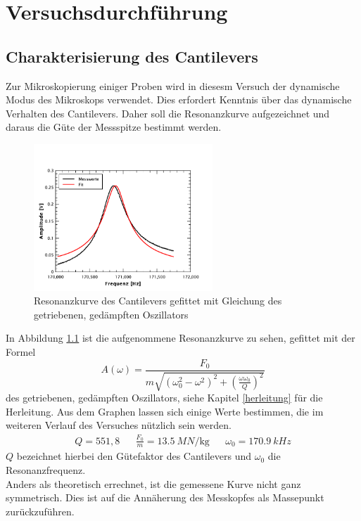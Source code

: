 \chapter{Versuchsdurchführung}

    \section{Charakterisierung des Cantilevers}

Zur Mikroskopierung einiger Proben wird in diesesm Versuch der dynamische Modus des
Mikroskops verwendet. Dies erfordert Kenntnis über das dynamische Verhalten des 
Cantilevers. Daher soll die Resonanzkurve aufgezeichnet und daraus die Güte der
Messspitze bestimmt werden. \par
\begin{figure}[hb]
    \centering
    \includegraphics[width=0.6\textwidth]{Mess/freqsweep_2.pdf}
    \caption{Resonanzkurve des Cantilevers gefittet mit Gleichung des getriebenen,
             gedämpften Oszillators}
    \label{freqsweep}
\end{figure}
In Abbildung \ref{freqsweep} ist die aufgenommene Resonanzkurve zu sehen, gefittet
mit der Formel
\[
    A(\omega) = \frac{F_0}{m \sqrt{(\omega_0^2 - \omega^2)^2 + \left( 
    \frac{\omega\omega_0}{Q} \right)^2} }
\]
des getriebenen, gedämpften Oszillators, siehe Kapitel \ref{herleitung} für die 
Herleitung. Aus dem Graphen lassen sich einige Werte
bestimmen, die im weiteren Verlauf des Versuches nützlich sein werden.
\begin{align*}
    Q=551,8 & & \frac{F_0}{m} = \SI{13,5}{MN\per\kg} & & \omega_0 =
    \SI{170,9}{kHz}
\end{align*}
$Q$ bezeichnet hierbei den Gütefaktor des Cantilevers und $\omega_0$ die 
Resonanzfrequenz. 
\vspace{6pt}\\
Anders als theoretisch errechnet, ist die gemessene Kurve nicht ganz symmetrisch.
Dies ist auf die Annäherung des Messkopfes als Massepunkt zurückzuführen.

